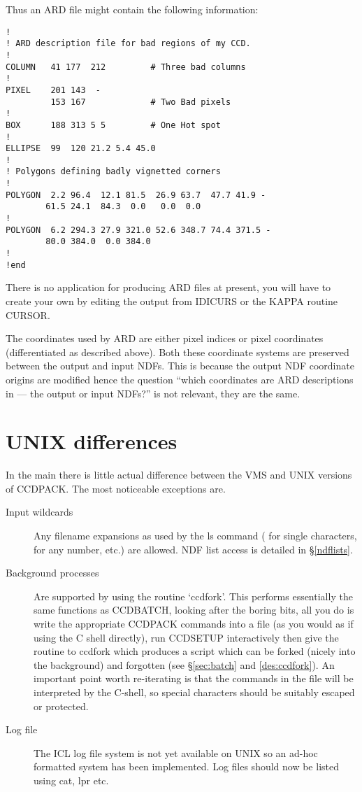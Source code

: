 Thus an ARD file might contain the following information:
\begin{myquote}
\begin{verbatim}
!
! ARD description file for bad regions of my CCD.
!
COLUMN   41 177  212         # Three bad columns
!
PIXEL    201 143  -
         153 167             # Two Bad pixels
!
BOX      188 313 5 5         # One Hot spot
!
ELLIPSE  99  120 21.2 5.4 45.0
!
! Polygons defining badly vignetted corners
!
POLYGON  2.2 96.4  12.1 81.5  26.9 63.7  47.7 41.9 -
        61.5 24.1  84.3  0.0   0.0  0.0
!
POLYGON  6.2 294.3 27.9 321.0 52.6 348.7 74.4 371.5 -
        80.0 384.0  0.0 384.0
!
!end
\end{verbatim}
\end{myquote}

There is no application for producing ARD files at present, you will
have to create your own by editing the output from IDICURS or the
KAPPA routine CURSOR.

The coordinates used by ARD are either pixel indices or pixel
coordinates (differentiated as described above). Both these coordinate
systems are  preserved between the output and input NDFs. This is
because the output NDF coordinate origins are modified hence the 
question ``which coordinates are ARD descriptions in --- the output or
input NDFs?'' is not relevant, they are the same.

\section{UNIX differences}

In the main there is little actual difference between the VMS and UNIX versions
of CCDPACK. The most noticeable exceptions are.

\begin{description}
   \item [Input wildcards] Any filename expansions as used by the ls 
         command (  for single characters, \myverb{*} for 
         any number, \myverb{[a-z]} etc.) are allowed. NDF list 
         access is detailed in \S\ref{ndflists}.

   \item [Background processes] Are supported by using the routine
       `ccdfork'. This performs essentially the same functions as
       CCDBATCH, looking after the boring bits, all you do is write
       the appropriate CCDPACK commands into a file (as you would as if
       using the C shell directly), run CCDSETUP
       interactively then give the routine to ccdfork which produces a
       script which can be forked (nicely into the background) and
       forgotten (see \S\ref{sec:batch} and \ref{des:ccdfork}).
       An important point worth re-iterating is that the commands
       in the file will be interpreted by the C-shell, so special characters 
       should be suitably escaped or protected.

   \item [Log file] The ICL log file system is not yet available on UNIX
       so an ad-hoc formatted system has been implemented. Log files
       should now be listed using cat, lpr etc.
\end{description}

